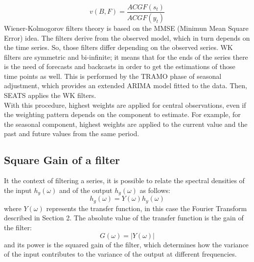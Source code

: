 \documentclass[english,blauw]{cbsdiscussionpaper}
\begin{document}
\begin{equation*}
v(B,F)=\frac{ACGF(s_{t})}{ACGF(y_{t})}
\end{equation*}
Wiener-Kolmogorov filters theory is based on the MMSE (Minimun Mean Square Error) idea. The filters derive from the observed model, which in turn depends on the time series. So, those filters differ depending on the observed series. WK filters are symmetric and bi-infinite; it means that for the ends of the series there is the need of forecasts and backcasts in order to get the estimations of those time points as well. This is performed by the TRAMO phase of seasonal adjustment, which provides an extended ARIMA model fitted to the data. Then, SEATS applies the WK filters.\\ With this procedure, highest weights are applied for central observations, even if the weighting pattern depends on the component to estimate. For example, for the seasonal component, highest weights are applied to the current value and the past and future values from the same period.
\subsection*{Square Gain of a filter}
It the context of filtering a series, it is possible to relate the spectral densities of the input $h_{y}(\omega)$ and of the output $h_{g}(\omega)$ as follows:
\begin{equation*}
h_{g}(\omega)=Y(\omega) h_{y}(\omega)
\end{equation*}
where $Y(\omega)$ represents the transfer function, in this case the Fourier Transform described in Section 2. The absolute value of the transfer function is the gain of the filter:
\begin{equation*}
G(\omega)=|Y(\omega)|
\end{equation*} 
and its power is the squared gain of the filter, which determines how the variance of the input contributes to the variance of the output at different frequencies.
\newpage


\end{document}
